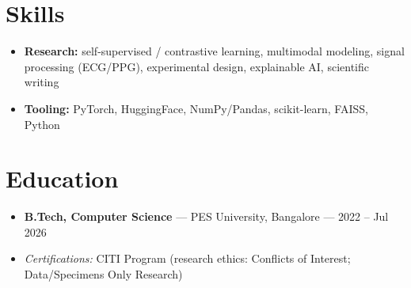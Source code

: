 \documentclass[10pt,a4paper]{article}
\begin{document}
\section*{Skills}
\begin{itemize}
\item \textbf{Research:} self-supervised / contrastive learning, multimodal modeling, signal processing (ECG/PPG), experimental design, explainable AI, scientific writing
\item \textbf{Tooling:} PyTorch, HuggingFace, NumPy/Pandas, scikit-learn, FAISS, Python
\end{itemize}
\section*{Education}
\begin{itemize}
\item \textbf{B.Tech, Computer Science} --- PES University, Bangalore --- 2022 -- Jul 2026
\item \textit{Certifications:} CITI Program (research ethics: Conflicts of Interest; Data/Specimens Only Research)
\end{itemize}
\end{document}
